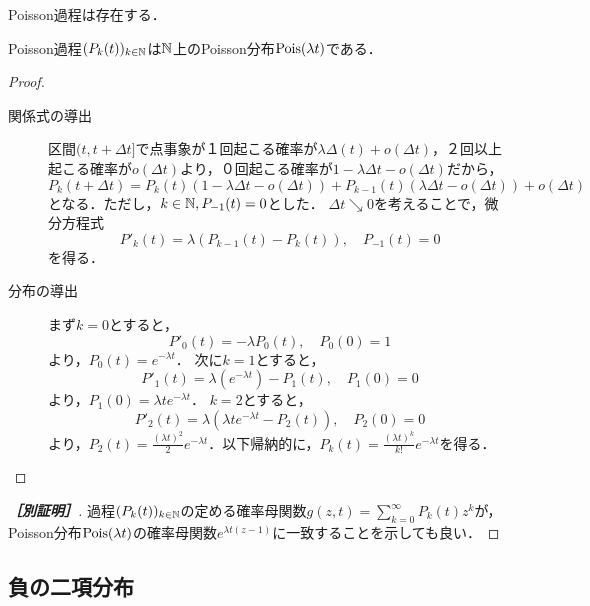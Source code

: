 \documentclass[uplatex,dvipdfmx]{jsreport}
\begin{document}
\begin{lemma}
    Poisson過程は存在する．
\end{lemma}

\begin{proposition}
    Poisson過程$(P_k(t))_{k\in\mathbb{N}}$は$\mathbb{N}$上のPoisson分布$\mathrm{Pois}(\lambda t)$である．
\end{proposition}
\begin{proof}\mbox{}
    \begin{description}
        \item[関係式の導出] 区間$(t,t+\Delta t]$で点事象が１回起こる確率が$\lambda\Delta(t)+o(\Delta t)$，２回以上起こる確率が$o(\Delta t)$より，０回起こる確率が$1-\lambda\Delta t-o(\Delta t)$だから，
        \[P_k(t+\Delta t)=P_k(t)(1-\lambda\Delta t-o(\Delta t))+P_{k-1}(t)(\lambda\Delta t-o(\Delta t))+o(\Delta t)\]
        となる．ただし，$k\in\mathbb{N},P_{-1}(t)=0$とした．
        $\Delta t\searrow 0$を考えることで，微分方程式
        \[P'_k(t)=\lambda(P_{k-1}(t)-P_k(t)),\quad P_{-1}(t)=0\]
        を得る．
        \item[分布の導出]
        まず$k=0$とすると，
        \[P'_0(t)=-\lambda P_0(t),\quad P_0(0)=1\]
        より，$P_0(t)=e^{-\lambda t}$．
        次に$k=1$とすると，
        \[P'_1(t)=\lambda(e^{-\lambda t})-P_1(t),\quad P_1(0)=0\]
        より，$P_1(0)=\lambda te^{-\lambda t}$．
        $k=2$とすると，
        \[P'_2(t)=\lambda(\lambda te^{-\lambda t}-P_2(t)),\quad P_2(0)=0\]
        より，$P_2(t)=\frac{(\lambda t)^2}{2}e^{-\lambda t}$．以下帰納的に，$P_k(t)=\frac{(\lambda t)^k}{k!}e^{-\lambda t}$を得る．
    \end{description}
\end{proof}
\begin{proof}[\textbf{［別証明］}]
    過程$(P_k(t))_{k\in\mathbb{N}}$の定める確率母関数$g(z,t)=\sum^\infty_{k=0}P_k(t)z^k$が，Poisson分布$\mathrm{Pois}(\lambda t)$の確率母関数$e^{\lambda t(z-1)}$に一致することを示しても良い．
\end{proof}

\subsection{負の二項分布}

\begin{tcolorbox}[colframe=ForestGreen, colback=ForestGreen!10!white,breakable,colbacktitle=ForestGreen!40!white,coltitle=black,fonttitle=\bfseries\sffamily,
title=]
    
\end{tcolorbox}
\end{document}
